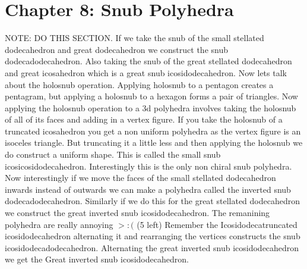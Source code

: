 \documentclass{article}
\begin{document}
\section*{Chapter 8: Snub Polyhedra}
NOTE: DO THIS SECTION.
If we take the snub of the small stellated dodecahedron and great dodecahedron we construct the snub dodecadodecahedron. Also taking the snub of the great stellated dodecahedron and great icosahedron which is a great snub icosidodecahedron. Now lets talk about the holosnub operation. Applying holosnub to a pentagon creates a pentagram, but applying a holosnub to a hexagon forms a pair of triangles. Now applying the holosnub operation to a 3d polyhedra involves taking the holosnub of all of its faces and adding in a vertex figure. If you take the holosnub of a truncated icosahedron you get a non uniform polyhedra as the vertex figure is an isoceles triangle. But truncating it a little less and then applying the holosnub we do construct a uniform shape. This is called the small snub icosicosidodecahedron. Interestingly this is the only non chiral snub polyhedra. Now interestingly if we move the faces of the small stellated dodecahedron inwards instead of outwards we can make a polyhedra called the inverted snub dodecadodecahedron. Similarly if we do this for the great stellated dodecahedron we construct the great inverted snub icosidodecahedron. The remanining polyhedra are really annoying $>:($ (5 left) 
Remember the Icosidodecatruncated icosidodecahedron alternating it and rearranging the vertices constructs the snub icosidodecadodecahedron.  Alternating the great inverted snub icosidodecahedron we get the Great inverted snub icosidodecahedron.
\newpage
\theendnotes
\end{document}
